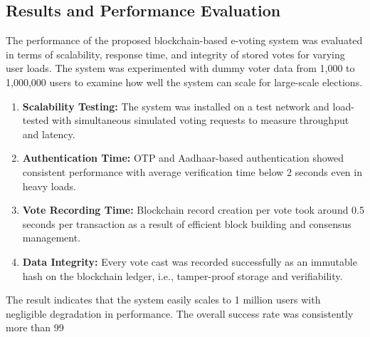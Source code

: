 \documentclass[conference]{IEEEtran}
\begin{document}
\subsection{Results and Performance Evaluation}

The performance of the proposed blockchain-based e-voting system was evaluated in terms of scalability, response time, and integrity of stored votes for varying user loads. The system was experimented with dummy voter data from 1,000 to 1,000,000 users to examine how well the system can scale for large-scale elections.

\begin{enumerate}
    \item \textbf{Scalability Testing:} The system was installed on a test network and load-tested with simultaneous simulated voting requests to measure throughput and latency.
\item \textbf{Authentication Time:} OTP and Aadhaar-based authentication showed consistent performance with average verification time below 2 seconds even in heavy loads.
\item \textbf{Vote Recording Time:} Blockchain record creation per vote took around 0.5 seconds per transaction as a result of efficient block building and consensus management.
\item \textbf{Data Integrity:} Every vote cast was recorded successfully as an immutable hash on the blockchain ledger, i.e., tamper-proof storage and verifiability.
\end{enumerate}
\begin{table}[H]
\caption{Performance Evaluation at Different User Loads}
\centering
\renewcommand{\arraystretch}{1.3} %
\end{table}

\noindent The result indicates that the system easily scales to 1 million users with negligible degradation in performance. The overall success rate was consistently more than 99%
\end{document}
